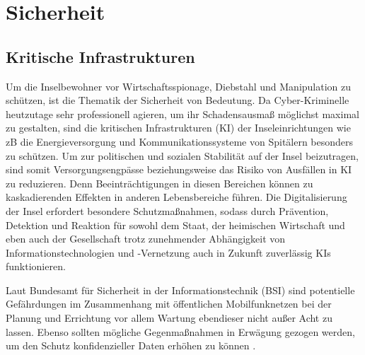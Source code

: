 
%
%
% 
% 
% 

\section{Sicherheit}
\label{sec:sicherheit}
\subsection{Kritische Infrastrukturen}
Um die Inselbewohner vor Wirtschaftsspionage, Diebstahl und Manipulation zu schützen, ist die Thematik der Sicherheit von Bedeutung. Da Cyber-Kriminelle heutzutage sehr professionell agieren, um ihr Schadensausmaß möglichst maximal zu gestalten, sind die kritischen Infrastrukturen (KI) der Inseleinrichtungen wie zB die Energieversorgung und Kommunikationssysteme von Spitälern besonders zu schützen. Um zur politischen und sozialen Stabilität auf der Insel beizutragen, sind somit Versorgungsengpässe beziehungsweise das Risiko von Ausfällen in KI zu reduzieren. Denn Beeinträchtigungen in diesen Bereichen können zu kaskadierenden Effekten in anderen Lebensbereiche führen. Die Digitalisierung der Insel erfordert besondere Schutzmaßnahmen, sodass durch Prävention, Detektion und Reaktion für sowohl dem Staat, der heimischen Wirtschaft und eben auch der Gesellschaft trotz zunehmender Abhängigkeit von Informationstechnologien und -Vernetzung auch in Zukunft zuverlässig KIs funktionieren\cite{BSI17}.

Laut Bundesamt für Sicherheit in der Informationstechnik (BSI) sind potentielle Gefährdungen im Zusammenhang mit öffentlichen Mobilfunknetzen bei der Planung und Errichtung vor allem Wartung ebendieser nicht außer Acht zu lassen. Ebenso sollten mögliche Gegenmaßnahmen in Erwägung gezogen werden, um den Schutz konfidenzieller Daten erhöhen zu können \cite{Ger08}.
